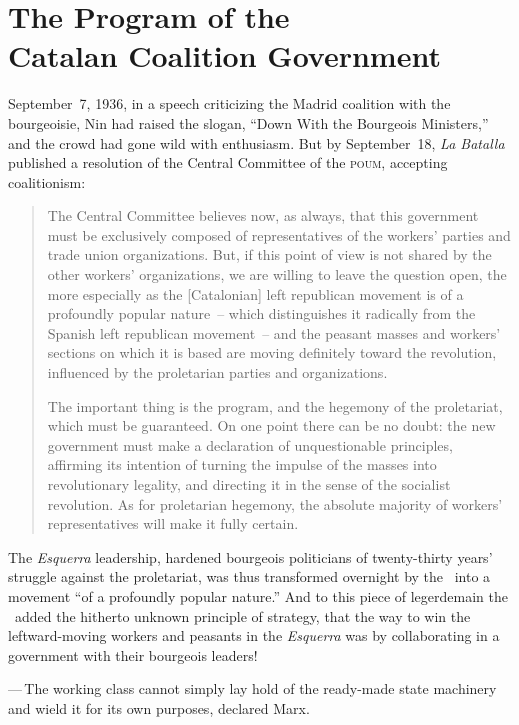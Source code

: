 \chapter[Program of the Catalan Coalition Government]{The Program of the \\ Catalan Coalition Government}

 September~7, 1936, in a speech criticizing the Madrid coalition with the bourgeoisie, Nin had raised the slogan, ``Down With the Bourgeois Ministers,'' and the crowd had gone wild with enthusiasm. But by September~18, \emph{La Batalla} published a resolution of the Central Committee of the \textsc{poum,} accepting coalitionism:

\begin{quotation}
  The Central Committee believes now, as always, that this government must be exclusively composed of representatives of the workers’ parties and trade union organizations. But, if this point of view is not shared by the other workers’ organizations, we are willing to leave the question open, the more especially as the [Catalonian] left republican movement is of a profoundly popular nature~-- which distinguishes it radically from the Spanish left republican movement~-- and the peasant masses and workers’ sections on which it is based are moving definitely toward the revolution, influenced by the proletarian parties and organizations.
  
  The important thing is the program, and the hegemony of the proletariat, which must be guaranteed. On one point there can be no doubt: the new government must make a declaration of unquestionable principles, affirming its intention of turning the impulse of the masses into revolutionary legality, and directing it in the sense of the socialist revolution. As for proletarian hegemony, the absolute majority of workers’ representatives will make it fully certain.
\end{quotation}

The \emph{Esquerra} leadership, hardened bourgeois politicians of twenty-thirty years’ struggle against the proletariat, was thus transformed overnight by the \POUM\ into a movement ``of a profoundly popular nature.'' And to this piece of legerdemain the \POUM\ added the hitherto unknown principle of strategy, that the way to win the leftward-moving workers and peasants in the \emph{Esquerra} was by collaborating in a government with their bourgeois leaders!

\medskip

—\,The working class cannot simply lay hold of the ready-made state machinery and wield it for its own purposes, declared Marx.


